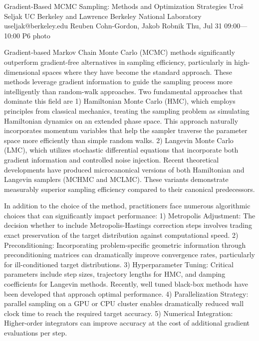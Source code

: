 \clearpage
\begin{talk}
  {Gradient-Based MCMC Sampling: Methods and Optimization Strategies}%
  {Uro\v s Seljak}%
  {UC Berkeley and Lawrence Berkeley National Laboratory}%
  {useljak@berkeley.edu}%
  {Reuben Cohn-Gordon, Jakob Robnik}%
  {}%
  {Thu, Jul 31 09:00---10:00}%
  {P6}%
  {photo}%
  
    
   
\vspace{-5ex}Gradient-based Markov Chain Monte Carlo (MCMC) methods significantly outperform gradient-free alternatives in sampling efficiency, particularly in high-dimensional spaces where they have become the standard approach. These methods leverage gradient information to guide the sampling process more intelligently than random-walk approaches.
Two fundamental approaches that dominate this field are 1)
Hamiltonian Monte Carlo (HMC), which  employs principles from classical mechanics, treating the sampling problem as simulating Hamiltonian dynamics on an extended phase space. This approach naturally incorporates momentum variables that help the sampler traverse the parameter space more efficiently than simple random walks. 2)
Langevin Monte Carlo (LMC), which utilizes stochastic differential equations that incorporate both gradient information and controlled noise injection. 
Recent theoretical developments have produced microcanonical versions of both Hamiltonian and Langevin samplers (MCHMC and MCLMC). These variants demonstrate measurably superior sampling efficiency compared to their canonical predecessors.

In addition to the choice of 
the method, 
practitioners face numerous algorithmic choices that can significantly impact performance:
1) Metropolis Adjustment: The decision whether to include Metropolis-Hastings correction steps involves trading exact preservation of the target distribution against computational speed.
2) Preconditioning: Incorporating problem-specific geometric information through preconditioning matrices can dramatically improve convergence rates, particularly for ill-conditioned target distributions.
3) Hyperparameter Tuning: Critical parameters include step sizes, trajectory lengths for HMC, and damping coefficients for Langevin methods. Recently, well tuned black-box methods have been developed that approach optimal performance. 
4) Parallelization Strategy: parallel sampling on a GPU or CPU cluster enables dramatically reduced wall clock time to reach the required target accuracy. 
5) Numerical Integration: Higher-order integrators can improve accuracy at the cost of additional gradient evaluations per step.


\end{talk}
